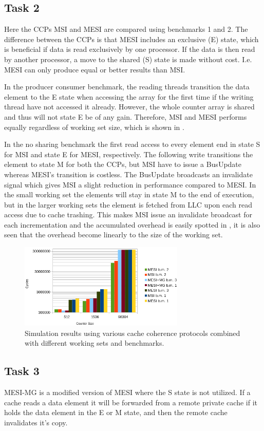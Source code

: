 \subsection{Task 2}
\label{sec:lab12}
Here the CCPs MSI and MESI are compared using benchmarks 1 and 2. The difference between the CCPs is that MESI includes an exclusive (E) state, which is beneficial if data is read exclusively by one processor. If the data is then read by another processor, a move to the shared (S) state is made without cost. I.e. MESI can only produce equal or better results than MSI.

In the producer consumer benchmark, the reading threads transition the data element to the E state when accessing the array for the first time if the writing thread have not accessed it already. However, the whole counter array is shared and thus will not state E be of any gain. Therefore, MSI and MESI performs equally regardless of working set size, which is shown in .

In the no sharing benchmark the first read access to every element end in state S for MSI and state E for MESI, respectively. The following write transitions the element to state M for both the CCPs, but MSI have to issue a BusUpdate whereas MESI's transition is costless. The BusUpdate broadcasts an invalidate signal which gives MSI a slight reduction in performance compared to MESI. In the small working set the elements will stay in state M to the end of execution, but in the larger working sets the element is fetched from LLC upon each read access due to cache trashing. This makes MSI issue an invalidate broadcast for each incrementation and the accumulated overhead is easily spotted in , it is also seen that the overhead become linearly to the size of the working set.

\begin{figure}[t]
	\center
	\includegraphics[width=0.7\textwidth]{bars}
	\caption{Simulation results using various cache coherence protocols combined with different working sets and benchmarks.}
	\label{fig:resultslab1}
\end{figure}

\subsection{Task 3}
\label{sec:lab13}
MESI-MG is a modified version of MESI where the S state is not utilized. If a cache reads a data element it will be forwarded from a remote private cache if it holds the data element in the E or M state, and then the remote cache invalidates it's copy.